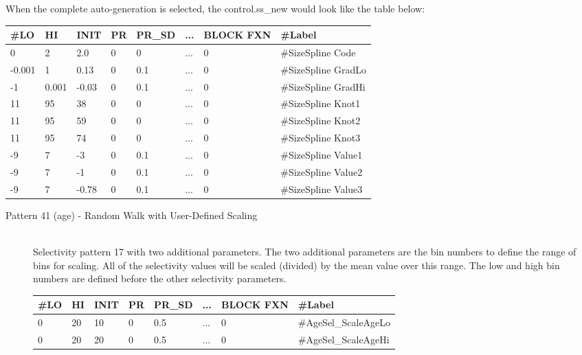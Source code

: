 \begin{description}
	When the complete auto-generation is selected, the control.ss\_new would look like the table below:
	
	\begin{center}
		\begin{longtable}{p{0.8cm} p{0.8cm} p{1cm} p{0.8cm} p{1.75cm}p{1cm} p{1.2cm} p{5.2cm}}
			\hline
			\#LO & HI & INIT & PR & PR\_SD & ... & BLOCK FXN & \#Label \\
			\hline
			0      &     2 &   2.0 & 0 & 0   & ... & 0 & \#SizeSpline Code\\
			-0.001 & 	 1 &  0.13 & 0 & 0.1 & ... & 0 & \#SizeSpline GradLo\\
			-1     & 0.001 & -0.03 & 0 & 0.1 & ... & 0 & \#SizeSpline GradHi\\
			11     & 	95 & 	38 & 0 & 0   & ... & 0 & \#SizeSpline Knot1\\
			11     & 	95 & 	59 & 0 & 0   & ... & 0 & \#SizeSpline Knot2\\
			11     & 	95 & 	74 & 0 & 0   & ... & 0 & \#SizeSpline Knot3\\
			-9     & 	 7 & 	-3 & 0 & 0.1 & ... & 0 & \#SizeSpline Value1\\
			-9     &   	 7 & 	-1 & 0 & 0.1 & ... & 0 & \#SizeSpline Value2\\
			-9     & 	 7 & -0.78 & 0 & 0.1 & ... & 0 & \#SizeSpline Value3\\
			\hline
		\end{longtable}
	\end{center}
\end{description}

\begin{description}
	\item[Pattern 41 (age) - Random Walk with User-Defined Scaling]\hfil\\
	Selectivity pattern 17 with two additional parameters. The two additional parameters are the bin numbers to define the range of bins for scaling. All of the selectivity values will be scaled (divided) by the mean value over this range. The low and high bin numbers are defined before the other selectivity parameters.

	\begin{center}
		\begin{longtable}{p{0.8cm} p{0.8cm} p{1cm} p{0.8cm} p{1.75cm}p{1cm} p{1.2cm} p{5.2cm}}
			\hline
			\#LO & HI & INIT & PR & PR\_SD & ... & BLOCK FXN & \#Label \\
			\hline
			0 & 20 & 10 & 0 & 0.5 & ... & 0 & \#AgeSel\_ScaleAgeLo \\
			0 & 20 & 20 & 0 & 0.5 & ... & 0 & \#AgeSel\_ScaleAgeHi \\
			\hline
		\end{longtable}
	\end{center}
\end{description}

